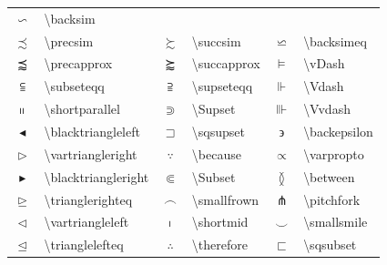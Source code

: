 \documentclass[a4paper]{ctexart}
\begin{document}
\begin{table}[H]
\begin{tabular}{clclcl}
            $\backsim$              & \textbackslash backsim                                                                \\
            $\precsim$              & \textbackslash precsim            & $\succsim$        & \textbackslash succsim        &
            $\backsimeq$            & \textbackslash backsimeq                                                              \\
            $\precapprox$           & \textbackslash precapprox         & $\succapprox$     & \textbackslash succapprox     &
            $\vDash$                & \textbackslash vDash                                                                  \\
            $\subseteqq$            & \textbackslash subseteqq          & $\supseteqq$      & \textbackslash supseteqq      &
            $\Vdash$                & \textbackslash Vdash                                                                  \\
            $\shortparallel$        & \textbackslash shortparallel      & $\Supset$         & \textbackslash Supset         &
            $\Vvdash$               & \textbackslash Vvdash                                                                 \\
            $\blacktriangleleft$    & \textbackslash blacktriangleleft  & $\sqsupset$       & \textbackslash sqsupset       &
            $\backepsilon$          & \textbackslash backepsilon                                                            \\
            $\vartriangleright$     & \textbackslash vartriangleright   & $\because$        & \textbackslash because        &
            $\varpropto$            & \textbackslash varpropto                                                              \\
            $\blacktriangleright$   & \textbackslash blacktriangleright & $\Subset$         & \textbackslash Subset         &
            $\between$              & \textbackslash between                                                                \\
            $\trianglerighteq$      & \textbackslash trianglerighteq    & $\smallfrown$     & \textbackslash smallfrown     &
            $\pitchfork$            & \textbackslash pitchfork                                                              \\
            $\vartriangleleft$      & \textbackslash vartriangleleft    & $\shortmid$       & \textbackslash shortmid       &
            $\smallsmile$           & \textbackslash smallsmile                                                             \\
            $\trianglelefteq$       & \textbackslash trianglelefteq     & $\therefore$      & \textbackslash therefore      &
            $\sqsubset$             & \textbackslash sqsubset                                                               \\
            \bottomrule
        \end{tabular}
    \end{table}
\end{document}
